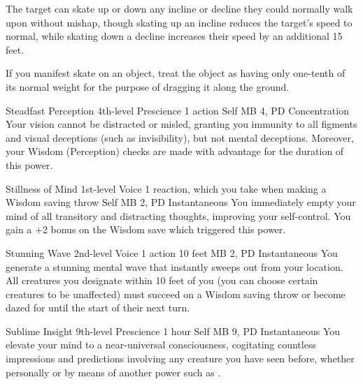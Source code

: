   The target can skate up or down any incline or decline
  they could normally walk upon without mishap,
  though skating up an incline reduces the target's speed to normal,
  while skating down a decline increases their speed
  by an additional 15 feet.
  
  If you manifest skate on an object,
  treat the object as having only one-tenth of its normal weight
  for the purpose of dragging it along the ground.

\DndPowerHeader%
  {Steadfast Perception}
  {4th-level Prescience}
  {1 action}
  {Self}
  {MB 4, PD \lvlfour}
  {Concentration}
  Your vision cannot be distracted or misled,
  granting you immunity to all figments and visual deceptions
  (such as invisibility),
  but not mental deceptions.
  Moreover, your Wisdom (Perception) checks
  are made with advantage for the duration of this power.

\DndPowerHeader%
  {Stillness of Mind}
  {1st-level Voice}
  {1 reaction, which you take when making a Wisdom saving throw}
  {Self}
  {MB 2, PD \lvlone}
  {Instantaneous}
You immediately empty your mind of all transitory and distracting thoughts,
improving your self-control.
You gain a +2 bonus on the Wisdom save which triggered this power.

\DndPowerHeader%
  {Stunning Wave}
  {2nd-level Voice}
  {1 action}
  {10 feet}
  {MB 2, PD \lvltwo}
  {Instantaneous}
  You generate a stunning mental wave that instantly
  sweeps out from your location.
  All creatures you designate within 10 feet of you
  (you can choose certain creatures to be unaffected)
  must succeed on a Wisdom saving throw
  or become dazed for until the start of their next turn.

\DndPowerHeader%
  {Sublime Insight}
  {9th-level Prescience}
  {1 hour}
  {Self}
  {MB 9, PD \lvlnine}
  {Instantaneous}
  You elevate your mind to a near-universal consciousness,
  cogitating countless impressions and predictions
  involving any creature you have seen before,
  whether personally or by means of another power
  such as .

